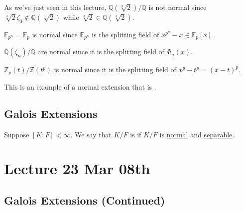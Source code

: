 \documentclass[notoc,notitlepage,nobib]{tufte-book}
\begin{document}
\begin{eg}
  As we've just seen in this lecture, $\mathbb{Q}(\sqrt[3]{2}) / \mathbb{Q}$ is
  not normal since $\sqrt[3]{2} \zeta_3 \notin \mathbb{Q}(\sqrt[3]{2})$ while
  $\sqrt[3]{2} \in \mathbb{Q}(\sqrt[3]{2})$.
\end{eg}

\begin{eg}
  $\mathbb{F}_{p^n} = \mathbb{F}_p$ is normal since $\mathbb{F}_{p^n}$ is the
  splitting field of $x^{p^n} - x \in \mathbb{F}_p[x]$.
\end{eg}

\begin{eg}
   $\mathbb{Q}(\zeta_n) / \mathbb{Q}$ are normal
  since it is the splitting field of $\Phi_n(x)$.
\end{eg}

\begin{eg}[\imponote]
  $\mathbb{Z}_p(t) / \mathbb{Z}(t^p)$ is normal since it is the splitting field
  of $x^p - t^p = (x - t)^p$.

  This is an example of a normal extension that is .
\end{eg}


\section{Galois Extensions}%
\label{sec:galois_extensions}

\begin{defn}\label{defn:galois_extension}
  Suppose $[ K : F ] < \infty$. We say that $K / F$ is  if $K /
  F$ is \hyperref[defn:normal_extension]{normal} and
  \hyperref[defn:separable_elements_and_separable_extensions]{separable}.
\end{defn}



\chapter{Lecture 23 Mar 08th}%
\label{chp:lecture_23_mar_08th}

\section{Galois Extensions (Continued)}%
\label{sec:galois_extensions_continued}
\end{document}
